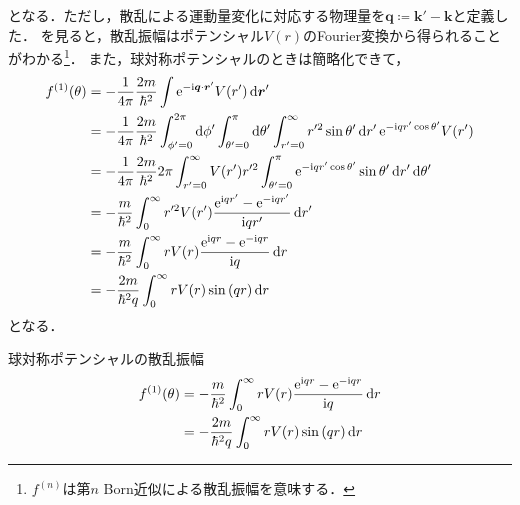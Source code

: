 \documentclass{report}
\begin{document}
  となる．ただし，散乱による運動量変化に対応する物理量を$\bm{q} \coloneqq \bm{k'} - \bm{k}$と定義した．
  を見ると，散乱振幅はポテンシャル$V(r)$のFourier変換から得られることがわかる\footnote{
    $f^{(n)}$は第$n$ Born近似による散乱振幅を意味する．
  }．
  また，球対称ポテンシャルのときは簡略化できて，
  \begin{align}
    f^{(1)}(\theta) &= -\frac{1}{4\pi}\frac{2m}{\hbar^2}\int\mathrm{e}^{-\mathrm{i} \bm{q}\cdot \bm{r}'} V(r') \dd{\bm{r}'}\\
    &= -\frac{1}{4\pi}\frac{2m}{\hbar^2} \int_{\phi' = 0}^{2\pi}\dd{\phi'} \int_{\theta' = 0}^{\pi}\dd{\theta'}\int_{r' = 0}^{\infty}r'^2 \sin\theta' \dd{r'} \mathrm{e}^{-\mathrm{i} qr' \cos\theta'} V(r') \\
    &= -\frac{1}{4\pi}\frac{2m}{\hbar^2} 2\pi \int_{r' = 0}^{\infty}V(r')r'^2\int_{\theta' = 0}^{\pi} \mathrm{e}^{-\mathrm{i} qr' \cos\theta'} \sin\theta' \dd{r'}\dd{\theta'} \\ 
    &= -\frac{m}{\hbar^2} \int_{0}^{\infty} r'^2V(r') \frac{\mathrm{e}^{\mathrm{i} qr'} - \mathrm{e}^{-\mathrm{i} qr'}}{\mathrm{i} qr'} \dd{r'} \\ 
    &= -\frac{m}{\hbar^2} \int_{0}^{\infty} rV(r) \frac{\mathrm{e}^{\mathrm{i} qr} - \mathrm{e}^{-\mathrm{i} qr}}{\mathrm{i} q} \dd{r} \\ 
    &= -\frac{2m}{\hbar^2 q} \int_{0}^{\infty} rV(r)\sin\qty(qr) \dd{r}
  \end{align}
  となる．
  \begin{itembox}[l]{球対称ポテンシャルの散乱振幅}
    \begin{align}
      f^{(1)}(\theta) &= -\frac{m}{\hbar^2} \int_{0}^{\infty} rV(r) \frac{\mathrm{e}^{\mathrm{i} qr} - \mathrm{e}^{-\mathrm{i} qr}}{\mathrm{i} q} \dd{r}\label{SCamp1st-exp} \\ 
      &= -\frac{2m}{\hbar^2 q} \int_{0}^{\infty} rV(r)\sin\qty(qr) \dd{r}\label{SCamp1st-sin}
    \end{align}
  \end{itembox}
\end{document}
